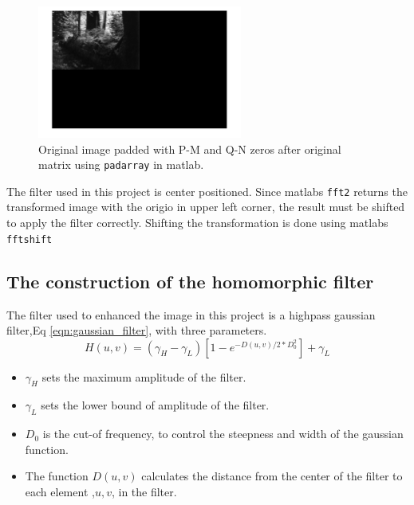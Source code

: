 \begin{figure}[h!]
  \begin{center}
    \includegraphics[width=0.6\textwidth]{pics/zeroPadded.png}
  \end{center}
  \cprotect\caption{Original image padded with P-M and Q-N zeros after original matrix using \verb~padarray~ in matlab.}
  \label{fig:zeropadded}    
\end{figure}

The filter used in this project is center positioned. Since matlabs \verb~fft2~ returns the transformed image with the origio in upper left corner, the result must be shifted to apply the filter correctly. Shifting the transformation is done using matlabs \verb~fftshift~

\subsection{The construction of the homomorphic filter}
The filter used to enhanced the image in this project is a highpass gaussian filter,Eq \ref{eqn:gaussian_filter}, with three parameters. 
    \begin{equation}
    \label{eqn:gaussian_filter}
      H(u,v) = \left( \gamma_H - \gamma_L \right) \left[ 1 - e^{- D(u,v) /2 * D_0^2}\right] + \gamma_L 
    \end{equation}

\begin{itemize}
  \item $\gamma_H$ sets the maximum amplitude of the filter.
  \item $\gamma_L$ sets the lower bound of amplitude of the filter.
  \item $D_0$ is the cut-of frequency, to control the steepness and width of the gaussian function.
  \item The function $D(u,v)$ calculates the distance from the center of the filter to each element ,$u,v$, in the filter.  
\end{itemize}

